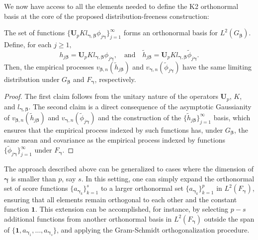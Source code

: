 \documentclass[11pt]{article}
\newcommand{\vect}[1]{\boldsymbol{#1}}
\newcommand{\phj}{\phi_{j\vect{\gamma}}}
\newcommand{\tphj}{\widetilde{\phi}_{j\vect{\gamma}}}
\newcommand{\hj}{h_{j\vect{\beta}}}
\newcommand{\thj}{\widetilde{h}_{j\vect{\beta}}}
\begin{document}
We now have access to all the elements needed to define the K2 orthonormal basis at the core of the proposed distribution-freeness construction:
\begin{prop} \label{prop:6}
The set of functions $\{\vect{U}_{p}K l_{\vect{\gamma},\vect{\beta}} \phj\}_{j=1}^\infty$ forms an orthonormal basis for $L^2(G_{\vect{\beta}})$. 
Define, for each $j \geq 1, $ 
\begin{equation*}
\hj = \vect{U}_{p}K l_{\vect{\gamma},\vect{\beta}} \phj, \quad \text{and} \quad \thj = \vect{U}_{p}K l_{\vect{\gamma},\vect{\beta}} \tphj.
\end{equation*}
Then, the empirical processes $v_{\vect{\beta},n}(\thj)$ and $v_{\vect{\gamma},n}(\tphj)$ have the same limiting distribution under $G_{\vect{\beta}}$ and $F_{\vect{\gamma}}$, respectively.
\end{prop} 
\begin{proof}
The first claim follows from the unitary nature of the operators $\vect{U}_{p}$, $K$, and $l_{\vect{\gamma},\vect{\beta}}$.  
The second claim is a direct consequence of the asymptotic Gaussianity of $v_{\vect{\beta},n}(\thj)$ and $v_{\vect{\gamma},n}(\tphj)$ and the construction of the $\{\thj\}_{j=1}^\infty$ basis, which ensures that the empirical process indexed by such functions has, under $G_{\vect{\beta}}$, the same mean and covariance as the empirical process indexed by functions $\{\tphj\}_{j=1}^\infty$ under $F_{\vect{\gamma}}$.
\end{proof}




The approach described above can be generalized to cases where the dimension of $\vect{\gamma}$ is smaller than $p$, say $s$. In this setting, one can simply expand the orthonormal set of score functions $\{a_{\vect{\gamma}_k}\}_{k=1}^s$ to a larger orthonormal set $\{a_{\vect{\gamma}_k}\}_{k=1}^p$ in $L^2(F_{\vect{\gamma}})$, ensuring that all elements remain orthogonal to each other and the constant function $\vect{1}$. This extension can be accomplished, for instance, by selecting $p-s$ additional functions from another orthonormal basis in $L^2(F_{\vect{\gamma}})$ outside the span of $\{\vect{1},a_{\vect{\gamma}_1},\dots,a_{\vect{\gamma}_s}\}$, and applying the Gram-Schmidt orthogonalization procedure.
\end{document}
